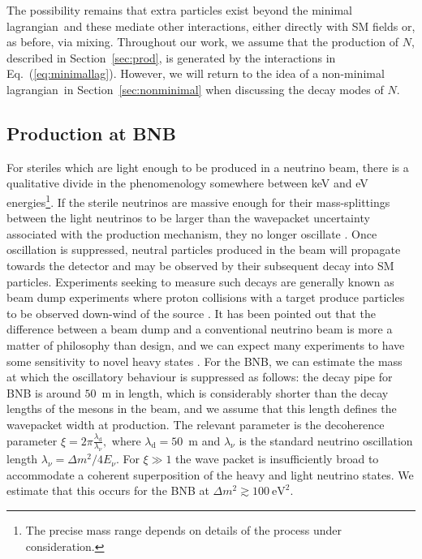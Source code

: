 \documentclass[11pt, a4paper]{article}
\newcommand{\refeq}[1]{Eq.~(\ref{#1})}
\newcommand{\refsec}[1]{Section~\ref{#1}}
\def\lagrangian{lagrangian}
\begin{document}
The possibility remains that extra particles exist beyond the minimal
\lagrangian\ and these mediate other interactions, either directly with SM
fields or, as before, via mixing. 
%
Throughout our work, we assume that the production of $N$, described in
\refsec{sec:prod}, is generated by the interactions in \refeq{eq:minimallag}.
However, we will return to the idea of a non-minimal \lagrangian\ in
\refsec{sec:nonminimal} when discussing the decay modes of $N$.

\subsection{\label{sec:prod}Production at BNB}

For steriles which are light enough to be produced in a neutrino beam, there is
a qualitative divide in the phenomenology somewhere between keV and eV
energies\footnote{The precise mass range depends on details of the process
under consideration.}. If the sterile neutrinos are massive enough for their
mass-splittings between the light neutrinos to be larger than the wavepacket
uncertainty associated with the production mechanism, they no longer oscillate
\cite{Akhmedov:2009rb}.  
%
Once oscillation is suppressed, neutral particles produced in the beam will
propagate towards the detector and may be observed by their subsequent decay
into SM particles. Experiments seeking to measure such decays are generally
known as beam dump experiments where proton collisions with a target produce
particles to be observed down-wind of the source \cite{CooperSarkar:1985nh,
Bergsma:1985is, Vaitaitis:1999wq, Bernardi:1985ny, Bernardi:1987ek,
Anelli:2015pba, Alekhin:2015byh}. It has been pointed out that the difference
between a beam dump and a conventional neutrino beam is more a matter of
philosophy than design, and we can expect many experiments to have some
sensitivity to novel heavy states \cite{Gorbunov:2007ak, Asaka:2012bb,
Adams:2013qkq}. 
%
For the BNB, we can estimate the mass at which the oscillatory behaviour is
suppressed as follows: the decay pipe for BNB is around $50$~m in length, which
is considerably shorter than the decay lengths of the mesons in the beam, and
we assume that this length defines the wavepacket width at production.  The
relevant parameter is the decoherence parameter \cite{Akhmedov:2009rb,
Hernandez:2011rs}
%
$\xi = 2\pi \frac{\lambda_\text{d}}{\lambda_\nu},$
%
where $\lambda_\text{d} = 50$~m and $\lambda_\nu$ is the standard neutrino
oscillation length $\lambda_\nu = \Delta m^2/4E_\nu$. For $\xi\gg1$ the wave
packet is insufficiently broad to accommodate a coherent superposition of the
heavy and light neutrino states. We estimate that this occurs for the BNB at 
%
$ \Delta m^2 \gtrsim 100~\text{eV}^2.$
%
\end{document}
